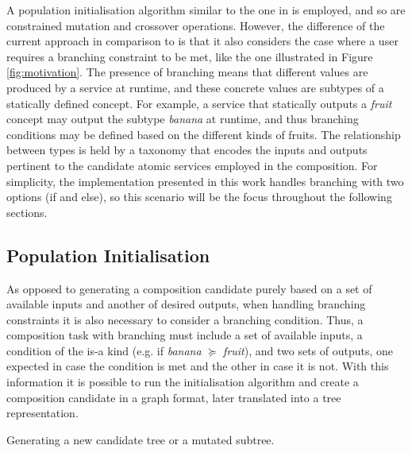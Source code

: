 \documentclass[conference]{IEEEtran}
\begin{document}
A population initialisation algorithm similar to the one in \cite{wang2013genetic} is employed, and so are constrained mutation and crossover operations. However, the difference of the current approach in comparison to \cite{wang2013genetic} is that it also considers the case where a user requires a branching constraint to be met, like the one illustrated in Figure \ref{fig:motivation}. The presence of branching means that different values are produced by a service at runtime, and these concrete values are subtypes of a statically defined concept. For example, a service that statically outputs a \textit{fruit} concept may output the subtype \textit{banana} at runtime, and thus branching conditions may be defined based on the different kinds of fruits. The relationship between types is held by a taxonomy that encodes the inputs and outputs pertinent to the candidate atomic services employed in the composition. For simplicity, the implementation presented in this work handles branching with two options (if and else), so this scenario will be the focus throughout the following sections.

\subsection{Population Initialisation}\label{init}
As opposed to generating a composition candidate purely based on a set of available inputs and another of desired outputs, when handling branching constraints it is also necessary to consider a branching condition. Thus, a composition task with branching must include a set of available inputs, a condition of the is-a kind (e.g. if \textit{banana} $\succeq$ \textit{fruit}), and two sets of outputs, one expected in case the condition is met and the other in case it is not. With this information it is possible to run the initialisation algorithm and create a composition candidate in a graph format, later translated into a tree representation.

\begin{algorithm}
 \setlength{}
 \LinesNumbered
 \SetNlSty{}{}{:}
 \vspace{2mm}
 \caption{\footnotesize Generating a new candidate tree or a mutated subtree.}
\label{generation}
\end{algorithm}
\end{document}
